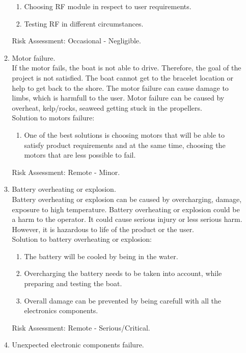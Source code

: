 \documentclass{article}[10pt]
\begin{document}
\begin{enumerate}
\begin{enumerate}
        \begin{enumerate}
            \item Choosing RF module in respect to user requirements.
            \item Testing RF in different circumstances. 
        \end{enumerate}
        Risk Assessment: Occasional - Negligible. 
        \item Motor failure.\\
        If the motor fails, the boat is not able to drive. Therefore, the goal of the project is not satisfied. The boat cannot get to the
        bracelet location or help to get back to the shore. The motor failure can cause damage to limbs, which is harmfull to the user.
        Motor failure can be caused by overheat, kelp/rocks, seaweed getting stuck in the propellers.\\
        Solution to motors failure:
        \begin{enumerate}
            \item One of the best solutions is choosing motors that will be able to satisfy product requirements and at the same time, 
            choosing the motors that are less possible to fail.
        \end{enumerate}
        Risk Assessment: Remote - Minor.
        \item Battery overheating or explosion.\\
        Battery overheating or explosion can be caused by overcharging, damage, exposure to high temperature. Battery overheating 
        or explosion could be a harm to the operator. It could cause serious injury or less serious harm. However, it 
        is hazardous to life of the product or the user.\\
        Solution to battery overheating or explosion:
        \begin{enumerate}
            \item The battery will be cooled by being in the water.
            \item Overcharging the battery needs to be taken into account, while preparing and testing the boat.
            \item Overall damage can be prevented by being carefull with all the electronics components.
        \end{enumerate}
        Risk Assessment: Remote - Serious/Critical.
        \item Unexpected electronic components failure.\\

\end{enumerate}
\end{enumerate}
\end{document}
